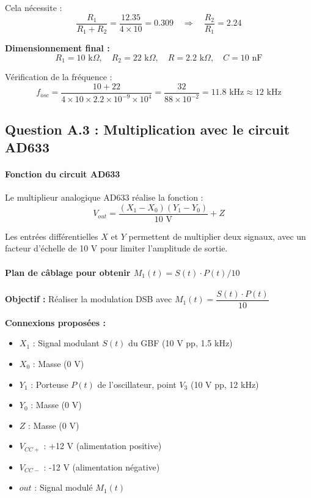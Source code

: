 \documentclass[11pt,a4paper]{article}
\begin{document}
Cela nécessite :
\begin{equation}
\frac{R_1}{R_1 + R_2} = \frac{12.35}{4 \times 10} = 0.309 \quad \Rightarrow \quad \frac{R_2}{R_1} = 2.24
\end{equation}

\textbf{Dimensionnement final :}
\begin{equation}
\boxed{R_1 = 10 \text{ k}\Omega, \quad R_2 = 22 \text{ k}\Omega, \quad R = 2.2 \text{ k}\Omega, \quad C = 10 \text{ nF}}
\end{equation}

Vérification de la fréquence :
\begin{equation}
f_{osc} = \frac{10 + 22}{4 \times 10 \times 2.2 \times 10^{-9} \times 10^4} = \frac{32}{88 \times 10^{-2}} = 11.8 \text{ kHz} \approx 12 \text{ kHz}
\end{equation}

\subsection{Question A.3 : Multiplication avec le circuit AD633}

\paragraph{Fonction du circuit AD633}

Le multiplieur analogique AD633 réalise la fonction :
\begin{equation}
V_{out} = \frac{(X_1 - X_0)(Y_1 - Y_0)}{10\text{ V}} + Z
\end{equation}

Les entrées différentielles $X$ et $Y$ permettent de multiplier deux signaux, avec un facteur d'échelle de 10 V pour limiter l'amplitude de sortie.

\paragraph{Plan de câblage pour obtenir $M_1(t) = S(t) \cdot P(t) / 10$}

\textbf{Objectif :} Réaliser la modulation DSB avec $M_1(t) = \dfrac{S(t) \cdot P(t)}{10}$

\textbf{Connexions proposées :}
\begin{itemize}
    \item $X_1$ : Signal modulant $S(t)$ du GBF (10 V pp, 1.5 kHz)
    \item $X_0$ : Masse (0 V)
    \item $Y_1$ : Porteuse $P(t)$ de l'oscillateur, point $V_3$ (10 V pp, 12 kHz)
    \item $Y_0$ : Masse (0 V)
    \item $Z$ : Masse (0 V)
    \item $V_{CC+}$ : +12 V (alimentation positive)
    \item $V_{CC-}$ : -12 V (alimentation négative)
    \item $out$ : Signal modulé $M_1(t)$
\end{itemize}
\end{document}
